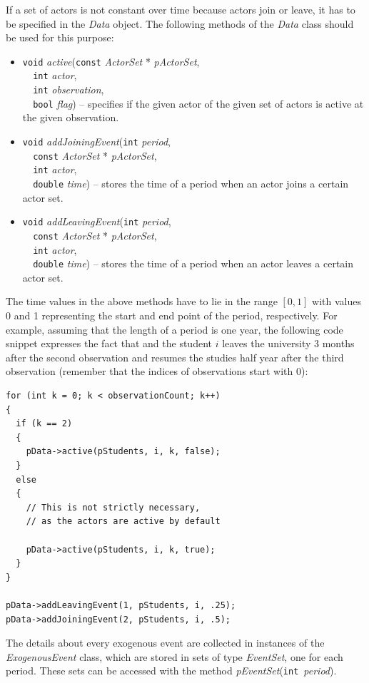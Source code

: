 \documentclass[12pt]{article}
\renewcommand{\=}{\,=\,}
\newcommand{\+}{\,+\,}
\newcommand{\nnm}[1]{\textsf{\small\textit{#1}}}
\begin{document}
If a set of actors is not constant over time because actors join or leave, it
has to be specified in the \nnm{Data} object. The following methods of the
\nnm{Data} class should be used for this purpose:
\begin{itemize}
\item \verb|void| \nnm{active}(\verb|const| \nnm{ActorSet} * \nnm{pActorSet},\\
\verb|  int| \nnm{actor},\\
\verb|  int| \nnm{observation},\\
\verb|  bool| \nnm{flag}) -- specifies if the given actor of the given set of
actors is active at the given observation.
\item \verb|void| \nnm{addJoiningEvent}(\verb|int| \nnm{period},\\
\verb|  const| \nnm{ActorSet} * \nnm{pActorSet},\\
\verb|  int| \nnm{actor},\\
\verb|  double| \nnm{time}) -- stores the time of a period when an actor joins
a certain actor set.
\item \verb|void| \nnm{addLeavingEvent}(\verb|int| \nnm{period},\\
\verb|  const| \nnm{ActorSet} * \nnm{pActorSet},\\
\verb|  int| \nnm{actor},\\
\verb|  double| \nnm{time}) -- stores the time of a period when an actor leaves
a certain actor set.
\end{itemize}
The time values in the above methods have to lie in the range $[0,1]$ with
values 0 and 1 representing the start and end point of the period, respectively.
For example, assuming that the length of a period is one year, the following
code snippet expresses the fact that and the student $i$ leaves the university 3
months after the second observation and resumes the studies half year after the
third observation (remember that the indices of observations start with 0):
\begin{verbatim}
for (int k = 0; k < observationCount; k++)
{
  if (k == 2)
  {
    pData->active(pStudents, i, k, false);
  }
  else
  {
    // This is not strictly necessary,
    // as the actors are active by default

    pData->active(pStudents, i, k, true);
  }
}

pData->addLeavingEvent(1, pStudents, i, .25);
pData->addJoiningEvent(2, pStudents, i, .5);
\end{verbatim}

The details about every exogenous event are collected in instances of the
\nnm{ExogenousEvent} class, which are stored in sets of type \nnm{EventSet},
one for each period. These sets can be accessed with the method
\nnm{pEventSet}(\verb|int|~\nnm{period}).
\end{document}
